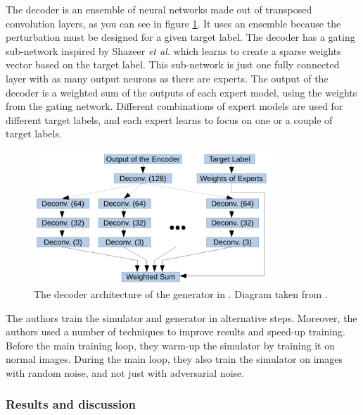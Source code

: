 The decoder is an ensemble of neural networks made out of transposed convolution layers, as you can see in figure \ref{fig:zheng_decoder}. It uses an ensemble because the perturbation must be designed for a given target label. The decoder has a gating sub-network inspired by Shazeer \textit{et al.} \cite{experts_mixture_gate} which learns to create a sparse weights vector based on the target label. This sub-network is just one fully connected layer with as many output neurons as there are experts. The output of the decoder is a weighted sum of the outputs of each expert model, using the weights from the gating network. Different combinations of expert models are used for different target labels, and each expert learns to focus on one or a couple of target labels.

\begin{figure}[h]
    \centering
    \includegraphics[width=0.8\textwidth]{graphics/decoder.PNG}
    \caption{The decoder architecture of the generator in \cite{zheng_black_box_GAN}. Diagram taken from \cite{zheng_black_box_GAN}.}
    \label{fig:zheng_decoder}
\end{figure}

The authors train the simulator and generator in alternative steps. Moreover, the authors used a number of techniques to improve results and speed-up training. Before the main training loop, they warm-up the simulator by training it on normal images. During the main loop, they also train the simulator on images with random noise, and not just with adversarial noise.

\subsubsection{Results and discussion}


